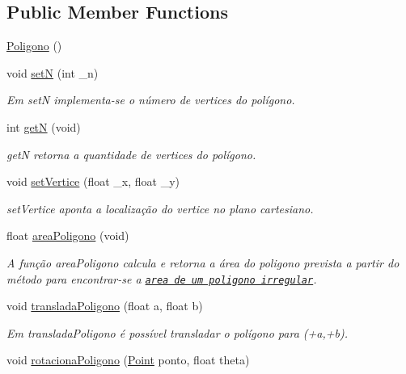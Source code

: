 \subsection*{Public Member Functions}
\begin{DoxyCompactItemize}
\item 
\hyperlink{class_poligono_a9311a9a1496878c09c8508b3636e2870}{Poligono} ()
\item 
void \hyperlink{class_poligono_a4d4cffe97d7190db1f8598b0f9f95763}{setN} (int \+\_\+n)
\begin{DoxyCompactList}\small\item\em Em {\itshape setN} implementa-\/se o número de vertices do polígono. \end{DoxyCompactList}\item 
int \hyperlink{class_poligono_a56257204345b9be3bb5d5fbe45ce63f1}{getN} (void)
\begin{DoxyCompactList}\small\item\em {\itshape getN} retorna a quantidade de vertices do polígono. \end{DoxyCompactList}\item 
void \hyperlink{class_poligono_a0784e2fb0149f6923a42bfabfb073719}{set\+Vertice} (float \+\_\+x, float \+\_\+y)
\begin{DoxyCompactList}\small\item\em {\itshape set\+Vertice} aponta a localização do vertice no plano cartesiano. \end{DoxyCompactList}\item 
float \hyperlink{class_poligono_a051cc49fca5417dbc8c6ba7a1edc2723}{area\+Poligono} (void)
\begin{DoxyCompactList}\small\item\em A função {\itshape area\+Poligono} calcula e retorna a área do poligono prevista a partir do método para encontrar-\/se a \href{https://pt.wikihow.com/Calcular-a-%C3%81rea-de-um-Pol%C3%ADgono}{\tt area de um poligono irregular}. \end{DoxyCompactList}\item 
void \hyperlink{class_poligono_a4d757f52ba9366ab13537fb19b363e1e}{translada\+Poligono} (float a, float b)
\begin{DoxyCompactList}\small\item\em Em {\itshape translada\+Poligono} é possível transladar o polígono para (+a,+b). \end{DoxyCompactList}\item 
void \hyperlink{class_poligono_ad4106abbe48a1c2824da456a4bf4cd71}{rotaciona\+Poligono} (\hyperlink{class_point}{Point} ponto, float theta)

\end{DoxyCompactItemize}
